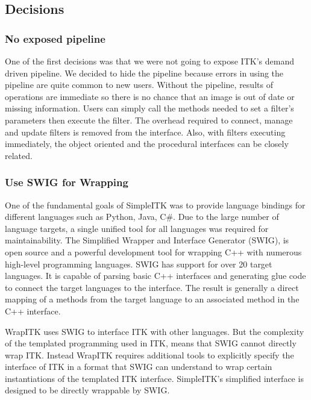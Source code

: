 \documentclass{frontiersMED} %
\begin{document}
\subsection{Decisions}
\subsubsection{No exposed pipeline}
One of the first decisions was that we were not going to expose ITK’s
demand driven pipeline. We decided to hide the pipeline because errors
in using the pipeline are quite common to new users. Without the
pipeline, results of operations are immediate so there is no chance
that an image is out of date or missing information. Users can simply
call the methods needed to set a filter’s parameters then execute the
filter.  The overhead required to connect, manage and update filters
is removed from the interface. Also, with filters executing
immediately, the object oriented and the procedural interfaces can be
closely related.

\subsubsection{Use SWIG for Wrapping}
One of the fundamental goals of SimpleITK was to provide language
bindings for different languages such as Python, Java, C\#. Due to the
large number of language targets, a single unified tool for all
languages was required for maintainability. The Simplified Wrapper and
Interface Generator (SWIG), is open source and a powerful
development tool for wrapping C++ with numerous high-level programming
languages. SWIG has support for over 20 target languages. It is
capable of parsing basic C++ interfaces and generating glue code to
connect the target languages to the interface. The result is generally
a direct mapping of a methods from the target language to an
associated method in the C++ interface.

WrapITK uses SWIG to interface ITK with other languages.  But the
complexity of the templated programming used in ITK, means that SWIG
cannot directly wrap ITK.  Instead WrapITK requires additional tools
to explicitly specify the interface of ITK in a format that SWIG can
understand to wrap certain instantiations of the templated ITK
interface. SimpleITK’s simplified interface is designed to be directly
wrappable by SWIG.
\end{document}

